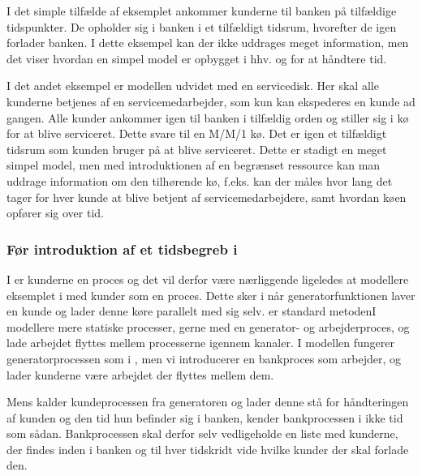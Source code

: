 I det simple tilfælde af eksemplet ankommer kunderne til banken på 
tilfældige tidspunkter.  De opholder sig i banken i et tilfældigt 
tidsrum, hvorefter de igen forlader banken. I dette eksempel kan der ikke 
uddrages meget information, men det viser hvordan en simpel model er opbygget i 
hhv.  \simpy og \pycsp for at håndtere tid.

I det andet eksempel er modellen udvidet med en servicedisk. Her skal alle 
kunderne betjenes af en servicemedarbejder, som kun kan ekspederes en kunde ad 
gangen. Alle kunder ankommer igen til banken i tilfældig orden og stiller sig i 
kø for at blive serviceret. Dette  svare til en M/M/1 kø. Det er igen et tilfældigt tidsrum som kunden bruger på at blive 
serviceret.  Dette er stadigt en meget simpel model, men med introduktionen af 
en begrænset ressource kan man uddrage information om den tilhørende kø, f.eks. 
kan der måles hvor lang det tager for hver kunde at blive betjent af 
servicemedarbejdere, samt hvordan køen opfører sig over tid. 

\subsubsection{Før introduktion af et tidsbegreb i \pycsp}
I \simpy er kunderne en proces og det vil derfor være nærliggende ligeledes at 
modellere eksemplet i \pycsp med kunder som en proces. Dette sker i  \simpy når
generatorfunktionen laver en kunde og lader denne køre parallelt med sig selv.  
 er standard metodenI \pycsp 
modellere mere statiske processer, gerne med en generator- og 
arbejderproces, og lade arbejdet flyttes 
mellem processerne igennem kanaler. I \pycsp modellen fungerer 
generatorprocessen som i \simpy, men vi introducerer en bankproces 
som arbejder, og lader kunderne være arbejdet der flyttes mellem dem. 

Mens \simpy kalder kundeprocessen fra generatoren og lader denne stå for håndteringen af kunden 
og den tid hun befinder sig i banken, kender bankprocessen i \pycsp ikke tid som 
sådan. Bankprocessen skal derfor selv vedligeholde en liste med kunderne, der findes inden i banken og til hver 
tidskridt vide hvilke kunder der skal forlade den. 

